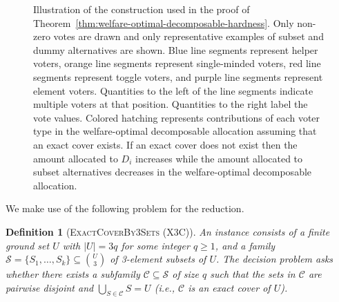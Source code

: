 \documentclass[11pt]{article}
\newtheorem{definition}{Definition}
\begin{document}
\begin{figure}
    \caption{Illustration of the construction used in the proof of Theorem~\ref{thm:welfare-optimal-decomposable-hardness}. Only non-zero votes are drawn and only representative examples of subset and dummy alternatives are shown. Blue line segments represent helper voters, orange line segments represent single-minded voters, red line segments represent toggle voters, and purple line segments represent element voters. Quantities to the left of the line segments indicate multiple voters at that position. Quantities to the right label the vote values. Colored hatching represents contributions of each voter type in the welfare-optimal decomposable allocation assuming that an exact cover exists. If an exact cover does not exist then the amount allocated to $D_i$ increases while the amount allocated to subset alternatives decreases in the welfare-optimal decomposable allocation.}
    \label{fig:reduction}
\end{figure}

We make use of the following problem for the reduction.

\begin{definition}[\textsc{ExactCoverBy3Sets} (X3C)]
    An instance consists of a finite ground set \(U\) with \(|U|=3q\) for some integer \(q\ge 1\), and a family \(\mathcal{S}=\{S_1,\dots,S_k\}\subseteq \binom{U}{3}\) of 3-element subsets of \(U\). The decision problem asks whether there exists a subfamily
    \(\mathcal{C}\subseteq \mathcal{S}\) of size \(q\) such that the sets in \(\mathcal{C}\) are pairwise disjoint and \(\bigcup_{S\in\mathcal{C}} S = U\) (i.e., \(\mathcal{C}\) is an exact cover of \(U\)).
\end{definition}
\end{document}
